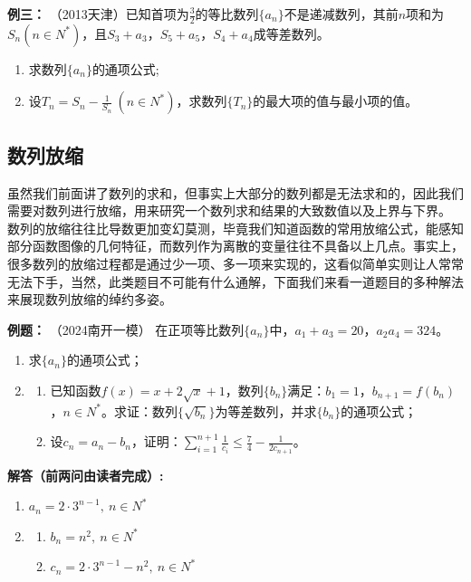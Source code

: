 \documentclass{article}
\begin{document}
\noindent \textbf{例三： }（2013天津）已知首项为$\frac{3}{2}$的等比数列$\{a_n\}$不是递减数列，其前$n$项和为$S_n(n\in N^*)$，且$S_3 + a_3$，$S_5 + a_5$，$S_4 + a_4$成等差数列。

\begin{enumerate}[label=(\Roman*)]
    \item 求数列$\{a_n\}$的通项公式;
    
    \item 设$T_n = S_n - \frac{1}{S_n}\ (n\in N^*)$，求数列$\{T_n\}$的最大项的值与最小项的值。
\end{enumerate}
\newpage

\subsection{数列放缩}
虽然我们前面讲了数列的求和，但事实上大部分的数列都是无法求和的，因此我们需要对数列进行放缩，用来研究一个数列求和结果的大致数值以及上界与下界。
数列的放缩往往比导数更加变幻莫测，毕竟我们知道函数的常用放缩公式，能感知部分函数图像的几何特征，而数列作为离散的变量往往不具备以上几点。事实上，
很多数列的放缩过程都是通过少一项、多一项来实现的，这看似简单实则让人常常无法下手，当然，此类题目不可能有什么通解，下面我们来看一道题目的多种解法来展现数列放缩的绰约多姿。
\vspace{2\baselineskip}

\noindent \textbf{例题： }（2024南开一模）
在正项等比数列$\{a_n\}$中，$a_1+a_3=20$，$a_2a_4=324$。

\begin{enumerate}[label=(\Roman*)]
    \item 求$\{a_n\}$的通项公式；
    
    \item 
    \begin{enumerate}[label=(\roman*)]
        \item 已知函数$f(x)=x+2\sqrt{x}+1$，数列$\{b_n\}$满足：$b_1=1$，$b_{n+1}=f(b_n)$，$n\in N^*$。求证：数列$\{\sqrt{b_n}\}$为等差数列，并求$\{b_n\}$的通项公式；
        
        \item 设$c_n=a_n-b_n$，证明：$\sum_{i=1}^{n+1}\frac{1}{c_i}\le \frac{7}{4}-\frac{1}{2c_{n+1}}$。
    \end{enumerate}
\end{enumerate}

\noindent \textbf{解答（前两问由读者完成）: }
\begin{enumerate}[label=(\Roman*)]
    \item $a_n=2\cdot 3^{n-1},\ n\in N^*$
    
    \item 
    \begin{enumerate}[label=(\roman*)]
        \item $b_n=n^2,\ n\in N^*$
        
        \item $c_n=2\cdot 3^{n-1}-n^2,\ n\in N^*$
    \end{enumerate}
\end{enumerate}
\end{document}
